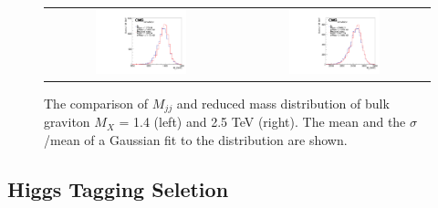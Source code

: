 \begin{figure}[t]
  \centering
  \begin{tabular}{cc}
    \includegraphics[width=0.5\textwidth]{Figures/red/1400.pdf} &
    \includegraphics[width=0.5\textwidth]{Figures/red/2500.pdf} \\
    
  \end{tabular}
  \caption{The comparison of $M_{jj}$ and reduced mass distribution of bulk graviton $M_X$ = 1.4 (left) and 2.5 TeV (right). The mean and the $\sigma $/mean of a Gaussian fit to the distribution are shown.}
  \label{fig:hvt_brs}
\end{figure}

\subsection{Higgs Tagging Seletion} 

